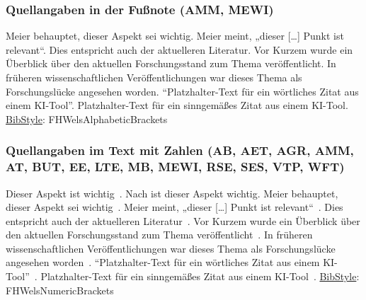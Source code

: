 \subsubsection{Quellangaben in der Fußnote (AMM, MEWI)}
Meier behauptet, dieser Aspekt sei wichtig.\newline
Meier meint, „dieser [\dots] Punkt ist relevant“.\newline
Dies entspricht auch der aktuelleren Literatur.\newline
Vor Kurzem wurde ein Überblick über den aktuellen Forschungsstand zum Thema veröffentlicht.\newline 
In früheren wissenschaftlichen Veröffentlichungen war dieses Thema als Forschungslücke angesehen worden.
\newline  
"`Platzhalter-Text für ein wörtliches Zitat aus einem KI-Tool"'. \newline 
Platzhalter-Text für ein sinngemäßes Zitat aus einem KI-Tool. \newline
\underline{BibStyle}: \textsf{FHWelsAlphabeticBrackets}

\subsubsection{Quellangaben im Text mit Zahlen (AB, AET, AGR, AMM, AT, BUT, EE, LTE, MB, MEWI, RSE, SES, VTP, WFT)}
Dieser Aspekt ist wichtig~\cite[vgl.][S. 5]{Meier:Globalisierung}.\newline
Nach \cite[S. 5]{Meier:Globalisierung} ist dieser Aspekt wichtig.\newline
Meier behauptet, dieser Aspekt sei wichtig~\cite[vgl.][S.~10]{Mueller:Meier}.\newline
Meier meint, „dieser […] Punkt ist relevant“~\cite[S.~5]{Mueller:Meier}.\newline
Dies entspricht auch der aktuelleren Literatur~\cite[vgl.][S.~10]{Mueller:Meier:Huber}.\newline
Vor Kurzem wurde ein Überblick über den aktuellen Forschungsstand zum Thema veröffentlicht~\cite[vgl.][S.~20-35]{Mueller:Meier:Huber:Tausch}.\newline
In früheren wissenschaftlichen Veröffentlichungen war dieses Thema als Forschungslücke angesehen worden~\cite[vgl.][S.~85]{Mueller:Meier:Huber:Tausch}.\newline
"`Platzhalter-Text für ein wörtliches Zitat aus einem KI-Tool"'~\cite{OpenAI:2023}.\newline 
Platzhalter-Text für ein sinngemäßes Zitat aus einem KI-Tool~\cite[Vgl.][]{OpenAI:2023}.\newline
\underline{BibStyle}: \textsf{FHWelsNumericBrackets}

